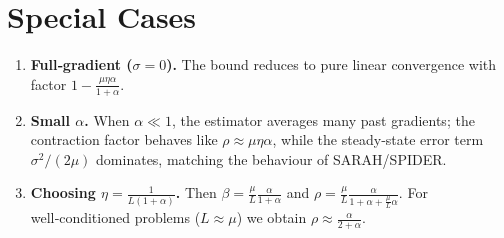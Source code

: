 \documentclass{article}
\begin{document}
\section*{Special Cases}
\begin{enumerate}
\item \textbf{Full‑gradient ($\sigma=0$).} The bound reduces to pure linear convergence with factor $1-\frac{\mu\eta\alpha}{1+\alpha}$.
\item \textbf{Small $\alpha$.} When $\alpha\ll1$, the estimator averages many past gradients; the contraction factor behaves like $\rho\approx\mu\eta\alpha$, while the steady‑state error term $\sigma^2/(2\mu)$ dominates, matching the behaviour of SARAH/SPIDER.
\item \textbf{Choosing $\eta=\frac{1}{L(1+\alpha)}$.} Then $\beta=\frac{\mu}{L}\frac{\alpha}{1+\alpha}$ and $\rho=\frac{\mu}{L}\frac{\alpha}{1+\alpha+\frac{\mu}{L}\alpha}$. For well‑conditioned problems ($L\approx\mu$) we obtain $\rho\approx\frac{\alpha}{2+\alpha}$.
\end{enumerate}
\end{document}
